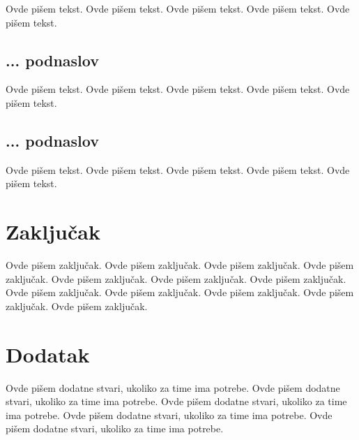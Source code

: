 \documentclass[a4paper]{article}
\begin{document}
Ovde pišem tekst. 
Ovde pišem tekst. 
Ovde pišem tekst. 
Ovde pišem tekst. 
Ovde pišem tekst. 

\subsection{... podnaslov}
\label{subsec:podnaslovK}

Ovde pišem tekst. 
Ovde pišem tekst. 
Ovde pišem tekst. 
Ovde pišem tekst. 
Ovde pišem tekst. 

\subsection{... podnaslov}
\label{subsec:podnaslovM}

Ovde pišem tekst. 
Ovde pišem tekst. 
Ovde pišem tekst. 
Ovde pišem tekst. 
Ovde pišem tekst. 


\section{Zaključak}
\label{sec:zakljucak}

Ovde pišem zaključak. 
Ovde pišem zaključak. 
Ovde pišem zaključak. 
Ovde pišem zaključak. 
Ovde pišem zaključak. 
Ovde pišem zaključak. 
Ovde pišem zaključak. 
Ovde pišem zaključak. 
Ovde pišem zaključak. 
Ovde pišem zaključak. 
Ovde pišem zaključak. 
Ovde pišem zaključak. 


\appendix
 


\appendix
\section{Dodatak}
Ovde pišem dodatne stvari, ukoliko za time ima potrebe.
Ovde pišem dodatne stvari, ukoliko za time ima potrebe.
Ovde pišem dodatne stvari, ukoliko za time ima potrebe.
Ovde pišem dodatne stvari, ukoliko za time ima potrebe.
Ovde pišem dodatne stvari, ukoliko za time ima potrebe.
\end{document}
